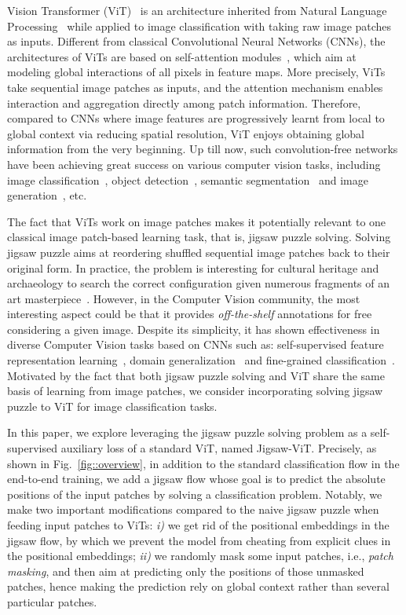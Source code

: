 \documentclass{article}
\begin{document}
Vision Transformer (ViT)~\cite{dosovitskiy2021an} 
is an architecture inherited from Natural Language Processing~\cite{vaswani2017attention} while applied to image classification with taking raw image patches as inputs. 
Different from classical Convolutional Neural Networks (CNNs), the architectures of ViTs are based on self-attention modules~\cite{vaswani2017attention}, which aim at modeling global interactions of all pixels in  feature maps. 
More precisely, ViTs take sequential image patches as inputs, and the attention mechanism enables  interaction and aggregation directly among patch information. 
Therefore, compared to CNNs where image features are progressively learnt from local to global context via reducing spatial resolution, ViT enjoys obtaining global information from the very beginning. 
Up till now, such convolution-free networks have been achieving great success on various computer vision tasks, including 
{image classification~\cite{touvron2021training,wu2021cvt,chen2021crossvit,li2022contextual,mao2022towards,yao2022wave}, object detection~\cite{liu2021swin,li2022contextual,yao2022dual}, semantic segmentation~\cite{strudel2021segmenter,liu2021swin,yao2022dual}} and image generation~\cite{chen2021pre}, etc.

The fact that ViTs work on image patches makes it potentially relevant to one classical image patch-based learning task, that is, jigsaw puzzle solving. 
Solving jigsaw puzzle aims at reordering shuffled sequential image patches back to their original form. 
In practice, the problem is interesting for cultural heritage and archaeology to search the correct configuration given numerous fragments of an art masterpiece~\cite{paumard2018image}. 
However, in the Computer Vision community, the most interesting aspect could be that it provides \textit{off-the-shelf} annotations for free
considering a given image. 
Despite its simplicity, it has shown effectiveness in diverse Computer Vision tasks based on CNNs such as: self-supervised feature representation learning~\cite{noroozi2016unsupervised}, domain generalization~\cite{carlucci2019domain} and fine-grained classification~\cite{du2020fine}. Motivated by the fact that both jigsaw puzzle solving and ViT share the same basis of learning from image patches, we consider incorporating solving jigsaw puzzle to ViT for image classification tasks.

In this paper, we explore leveraging the jigsaw puzzle solving problem as a self-supervised auxiliary loss of a standard ViT, named Jigsaw-ViT.
Precisely, as shown in Fig.~\ref{fig::overview}, in addition to the standard classification flow in the end-to-end training, we add a jigsaw flow whose goal is to predict the absolute positions of the input patches by solving a classification problem.
Notably, we make two important modifications compared to the naive jigsaw puzzle when feeding input patches to ViTs:
\textit{i)} we get rid of the positional embeddings in the jigsaw flow, by which we prevent the model from cheating from explicit clues in the positional embeddings;
\textit{ii)} we randomly mask some input patches, i.e., \emph{patch masking}, and then aim at predicting only the positions of those unmasked patches, hence making the prediction rely on global context rather than several particular patches.
\end{document}
